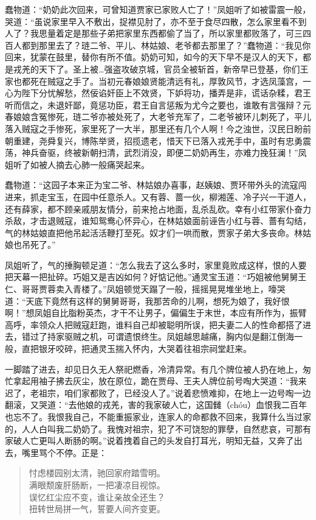 \documentclass[12pt,oneside]{book}
\newenvironment{shici}{%
\begin{verse}%
\centering\large\hspace{12pt}}%
{\end{verse}}
\begin{document}
蠢物道：“奶奶此次回来，可曾知道贾家已家败人亡了！”凤姐听了如被雷震一般，哭道：“虽说家里早入不敷出，捉襟见肘了，亦不至于食尽四散，怎么家里看不到人了？我思量着定是那些子弟把家里东西都偷了当了，所以家里都败落了，可三四百人都到那里去了？琏二爷、平儿、林姑娘、老爷都去那里了？”蠢物道：“我见你回来，犹蒙在鼓里，替你有所不值。奶奶可知，如今的天下早不是汉人的天下，都是戎羌的天下了。圣上被…强盗攻破京城，官员全被斩首，新帝早已登基，你们王家也都死在贼寇之手了。当初元春娘娘贤能清远有礼，厚敦风节，才选凤藻宫，一心为陛下分忧解愁，然佞谄奸臣上不效贤，下妒将功，播弄是非，谎话杂糅，君王听而信之，未退奸鄙，竟惩功臣，君王自言惩叛为尤今之要也，谁敢有言强辩？元春娘娘含冤惨死，琏二爷亦被处死了，大老爷充军了，二老爷被环儿刺死了，平儿落入贼寇之手惨死，家里死了一大半，那里还有几个人啊！今之浊世，汉民日盼前朝重建，尧舜复兴，博陈举贤，招揽遗老，惜天下已落入戎羌手中，虽时有忠勇震荡，神兵奋驱，终被新朝扫清，武烈消没，即便二奶奶再生，亦难力挽狂澜！”凤姐听了如被人摘去心肺一般痛哭起来。

蠢物道：“这园子本来正为宝二爷、林姑娘办喜事，赵姨娘、贾环带外头的流寇闯进来，抓走宝玉，在园中任意杀人。又有蓉、蔷一伙，柳湘莲、冷子兴一干道人，还有薛家，都不顾亲戚朋友情分，前来抢占地面，乱杀乱砍。幸有小红带家仆奋力杀敌，才击退贼寇，谁知鸳鸯心怀异心，在林姑娘面前诬告小红与蓉、蔷有勾结，气的林姑娘直把他吊起活活鞭打至死。奴才们一哄而散，贾家子弟大多丧命。林姑娘也吊死了。”

凤姐听了，气的捶胸顿足道：“怎么我去了这么多时，家里竟败成这样，恨的人要把天幕一把扯碎。巧姐又是吉凶如何？好惦记他。”通灵宝玉道：“巧姐被他舅舅王仁、哥哥贾蓉卖入青楼了。”凤姐顿觉天蹋了一般，摇摇晃晃堆坐地上，嚎哭道：“天底下竟然有这样的舅舅哥哥，我那苦命的儿啊，想死为娘了，我好恨啊！”想凤姐自比脂粉英杰，才干不让男子，偏偏生于末世，本应有所作为，振臂高呼，率领众人把贼寇赶跑，谁料自己却被聪明所误，把夫妻二人的性命都搭了进去，错过了持家驱贼之机，可谓遗恨终生。凤姐越思越痛，胸内似是翻江倒海一般，直把银牙咬碎，把通灵玉揣入怀内，大哭着往祖宗祠堂赶来。

一脚踏了进去，却见日久无人祭祀燃香，冷清异常。有几个牌位被人扔在地上，匆忙拿起用袖子拂去灰尘，放在原位，跪在贾母、王夫人牌位前号啕大哭道：“我来迟了，老祖宗，咱们家都败了，已经没人了。”说着悲愤难抑，在地上一边号啕一边翻滚，又哭道：“去他娘的戎羌，害的我家破人亡，这国雠（chóu）血恨我二百年也忘不了。我恨我自己，不能重振家业，连家人的命都救不回来，我算什么当过家的，人人白叫我二奶奶了。我愧对祖宗，犯了不可饶恕的罪孽，自然悲哀，可那有家破人亡更叫人断肠的啊。”说着拽着自己的头发自打耳光，明知无益，又奔了出去，嘴里骂个不停。正是：

\begin{shici}
忖虑楼园别太清，驰回家府踏雪明。\\
满眼颓废肝肠断，一把凄凉目视惊。\\
误忆红尘应不变，谁让亲故全还生？\\
扭转世局拼一气，誓要人间齐变更。
\end{shici}
\end{document}
